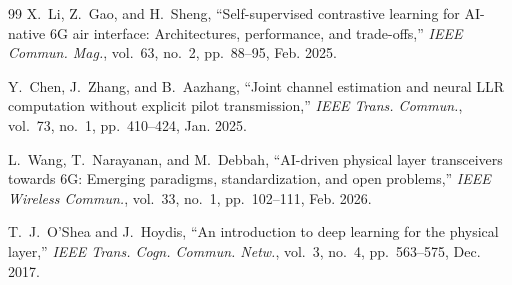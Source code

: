﻿\documentclass[journal,twoside]{IEEEtran}
\begin{document}
\begin{thebibliography}{99}
X.~Li, Z.~Gao, and H.~Sheng, ``Self-supervised contrastive learning for AI-native 6G air interface: Architectures, performance, and trade-offs,''
\emph{IEEE Commun. Mag.}, vol.~63, no.~2, pp.~88--95, Feb. 2025.

Y.~Chen, J.~Zhang, and B.~Aazhang, ``Joint channel estimation and neural LLR computation without explicit pilot transmission,''
\emph{IEEE Trans. Commun.}, vol.~73, no.~1, pp.~410--424, Jan. 2025.

L.~Wang, T.~Narayanan, and M.~Debbah, ``AI-driven physical layer transceivers towards 6G: Emerging paradigms, standardization, and open problems,''
\emph{IEEE Wireless Commun.}, vol.~33, no.~1, pp.~102--111, Feb. 2026.

T.~J.~O'Shea and J.~Hoydis, ``An introduction to deep learning for the physical layer,''
\emph{IEEE Trans. Cogn. Commun. Netw.}, vol.~3, no.~4, pp.~563--575, Dec. 2017.

\end{thebibliography}
\end{document}
